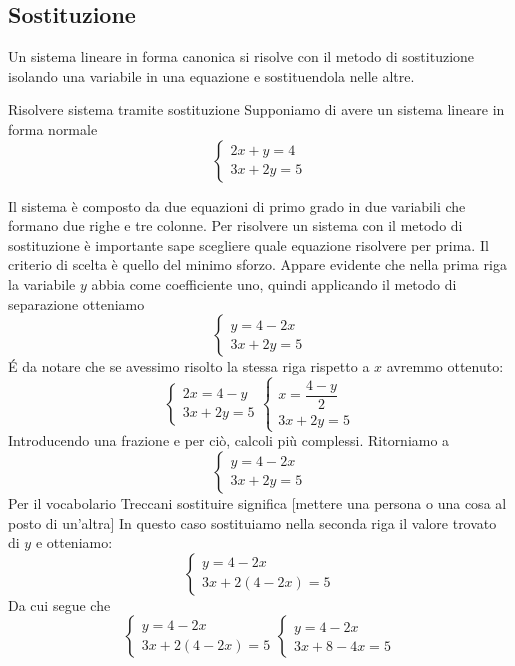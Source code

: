\subsection{Sostituzione}
\label{sec:Sostituzione}
Un sistema lineare in forma canonica si risolve con il metodo di sostituzione isolando una variabile in una equazione e sostituendola nelle altre. 
\begin{esempiot}{Risolvere sistema tramite sostituzione}{}
	Supponiamo di avere un sistema lineare in forma normale
	\[
	\begin{cases}
	2x+y=4\\
	3x+2y=5
	\end{cases}
	\]
\end{esempiot}
Il sistema è composto da due equazioni di primo grado in due variabili che formano due righe e tre colonne. Per risolvere un sistema con il metodo di sostituzione è importante sape scegliere quale equazione risolvere per prima. Il criterio di scelta è quello del minimo sforzo. Appare evidente che nella prima riga la variabile $y$ abbia come coefficiente  uno, quindi applicando il metodo di separazione otteniamo \[
\begin{cases}
y=4-2x\\
3x+2y=5
\end{cases}
\]
\'E da notare che se avessimo risolto la stessa riga rispetto a $x$ avremmo ottenuto:
\[
\begin{cases}
	2x=4-y\\
	3x+2y=5
\end{cases}
\begin{cases}
	x=\dfrac{4-y}{2}\\
	3x+2y=5
\end{cases}
\]
Introducendo una frazione e per ciò, calcoli più complessi.
Ritorniamo a \[
\begin{cases}
y=4-2x\\
3x+2y=5
\end{cases}
\] Per il vocabolario Treccani sostituire significa [mettere una persona o una cosa al posto di un'altra] In questo caso sostituiamo nella seconda riga il valore trovato di $y$ e otteniamo:
\[
\begin{cases}
y=4-2x\\
3x+2(4-2x)=5
\end{cases}
\]
Da cui segue che 
\[
\begin{cases}
y=4-2x\\
3x+2(4-2x)=5
\end{cases}
\begin{cases}
y=4-2x\\
3x+8-4x=5
\end{cases}
\]
